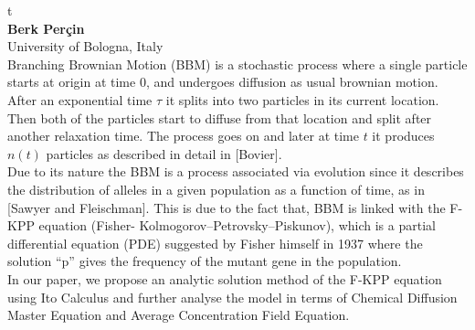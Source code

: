 \documentclass[12pt,a4paper]{article}
\begin{document}
\bigskip \bigskip  %

\noindent
{\Large t}\\[1ex]
{\large 
\textbf{Berk Perçin}\\[1ex] University of Bologna, Italy}\\[2ex]
Branching Brownian Motion (BBM) is a stochastic process where a single particle starts at origin at time 0, and undergoes diffusion as usual brownian motion. After an exponential time $\tau$ it splits into two particles in its current location. Then both of the particles start to diffuse from that location and split after another relaxation time. The process goes on and later at time $t$ it produces $n(t)$ particles as described in detail in [Bovier]. 
\\
Due to its nature the BBM is a process associated via evolution since it describes the  distribution of alleles in a given population as a function of time, as in [Sawyer and Fleischman]. This is due to the fact that, BBM is linked with the F-KPP equation (Fisher- Kolmogorov–Petrovsky–Piskunov), which is a partial differential equation (PDE) suggested by Fisher himself in 1937 where the solution “p” gives the frequency of the mutant gene in the population. 
\\
In our paper, we propose an analytic solution method of the F-KPP equation using Ito Calculus and further analyse the model in terms of Chemical Diffusion Master Equation and Average Concentration Field Equation. 

\bigskip \bigskip  %
\end{document}
